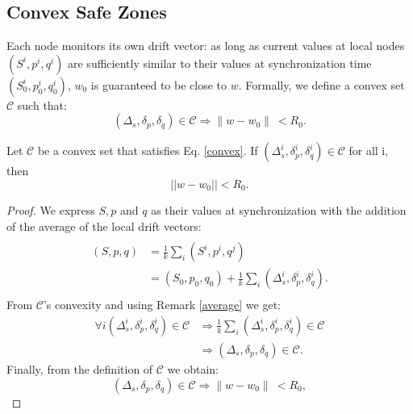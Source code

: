 \subsection{Convex Safe Zones}
Each node monitors its own drift vector: as long as current values
at local nodes $(S^i,p^i,q^i)$ are sufficiently similar to their values
at synchronization time $(S^i_0,p^i_0,q^i_0)$, $w_0$ is guaranteed to be close to $w$.
Formally, we define a convex set $\mathcal{C}$ such that:
\begin{equation} \label{convex}
(\Delta_s, \delta_p, \delta_q) \in \mathcal{C} \Rightarrow \parallel w-w_0
\parallel \ < R_0.
\end{equation}
\begin{lemma} \label{averages}
Let $\mathcal{C}$ be a convex set that satisfies Eq. \ref{convex}.
If $(\Delta_s^i, \delta_p^i, \delta_q^i) \in \mathcal{C}$ for all i, then
\begin{equation*}
||w-w_0|| < R_0.
\end{equation*}
\end{lemma}
\begin{proof}
We express $S, p$ and $q$ as their values at synchronization with the addition of the average of the local drift vectors:
\begin{equation}
\begin{split}
\\(S,p,q) & = \frac{1}{k} \sum_i (S^i,p^i,q^j) \\
 & = (S_0,p_0,q_0) + \frac{1}{k} \sum_i (\Delta_s^i,\delta^i_p,\delta_q^i). \\
\end{split}
\end{equation}
From $\mathcal{C}$'s convexity and using Remark \ref{average} we get:
\begin{equation}
\begin{split}
\forall i (\Delta_s^i,\delta^i_p,\delta_q^i) \in \mathcal{C} & \Rightarrow
\frac{1}{k} \sum_i (\Delta_s^i,\delta^i_p,\delta_q^i) \in \mathcal{C} \\
& \Rightarrow (\Delta_s,\delta_p,\delta_q) \in \mathcal{C}.
\end{split}
\end{equation}
Finally, from the definition of $\mathcal{C}$ we obtain:
\begin{equation}
(\Delta_s,\delta_p,\delta_q) \in \mathcal{C} \Rightarrow \parallel w-w_0
\parallel \ < R_0,
\end{equation}
\end{proof}

